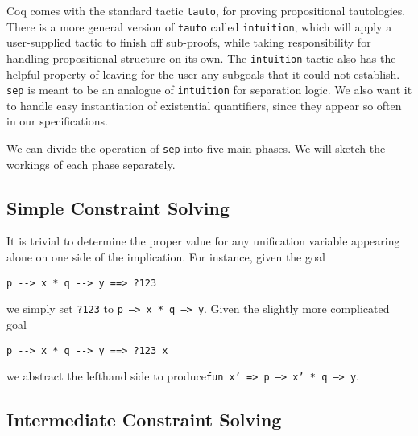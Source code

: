 \documentclass[preprint,nocopyrightspace]{sigplanconf}
\newcommand{\cd}[1]{\texttt{#1}}
\begin{document}
Coq comes with the standard tactic \cd{tauto}, for proving propositional tautologies.  There is a more general version of \cd{tauto} called \cd{intuition}, which will apply a user-supplied tactic to finish off sub-proofs, while taking responsibility for handling propositional structure on its own.  The \cd{intuition} tactic also has the helpful property of leaving for the user any subgoals that it could not establish.  \cd{sep} is meant to be an analogue of \cd{intuition} for separation logic.  We also want it to handle easy instantiation of existential quantifiers, since they appear so often in our specifications.

We can divide the operation of \cd{sep} into five main phases.  We will sketch the workings of each phase separately.

\subsection{Simple Constraint Solving}

It is trivial to determine the proper value for any unification variable appearing alone on one side of the implication.  For instance, given the goal
\begin{verbatim}
p --> x * q --> y ==> ?123
\end{verbatim}
we simply set \cd{?123} to \cd{p --> x * q --> y}.  Given the slightly more complicated goal
\begin{verbatim}
p --> x * q --> y ==> ?123 x
\end{verbatim}
we abstract the lefthand side to produce\cd{fun x' => p --> x' * q --> y}.

\subsection{Intermediate Constraint Solving}
\end{document}
